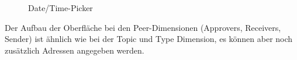 \begin{minipage}{0.47\linewidth}
	\begin{figure}[H]
		\centering
		\caption{Date/Time-Picker}
		\label{fig:time2}
	\end{figure}
\end{minipage}
\newline\newline\newline Der Aufbau der Oberfläche bei den Peer-Dimensionen (Approvers, Receivers, Sender) ist ähnlich wie bei der Topic und Type Dimension, es können aber noch zusätzlich Adressen angegeben werden. 
